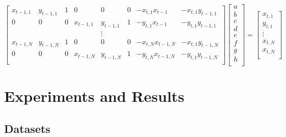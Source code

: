 \documentclass[12pt]{article}
\begin{document}
\begin{equation}
\begin{bmatrix}
x_{t-1,1}& y_{t-1,1}&1&0&0&0 &-x_{t,1}x_{t-1}& -x_{t,1}y_{t-1,1}\\
0&0&0&x_{t-1,1}& y_{t-1,1}&1& -y_{t,1}x_{t-1} &-y_{t,1}y_{t-1,1}\\
&&&&\vdots&&\\
x_{t-1,N}& y_{t-1,N}&1&0&0&0& -x_{t,N}x_{t-1,N}& -x_{t,1}y_{t-1,N}\\
0&0&0&x_{t-1,N}& y_{t-1,N}&1& -y_{t,N}x_{t-1,N}& -y_{t,1}y_{t-1,N}\\
\end{bmatrix}
\begin{bmatrix}
a\\
b\\
c\\
d\\
e\\
f\\
g\\
h\\
\end{bmatrix} = 
\begin{bmatrix}
x_{t,1}\\
y_{t,1}\\
\vdots\\
x_{t,N}\\
x_{t,N}\\
\end{bmatrix}
\end{equation}

\section{Experiments and Results}

\subsection{Datasets}
\end{document}
